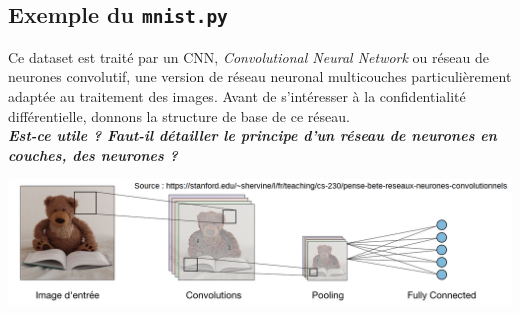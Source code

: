 \documentclass[a4paper,11pt]{article} %
\newcommand{\ttt}[1]{\texttt{#1}}
\begin{document}
\subsection{Exemple du \ttt{mnist.py}}
%
Ce dataset est traité par un CNN, \emph{Convolutional Neural Network} ou réseau de neurones convolutif, une version de réseau neuronal multicouches particulièrement adaptée au traitement des images. Avant de s'intéresser à la confidentialité différentielle, donnons la structure de base de ce réseau.\\
\textbf{\emph{Est-ce utile ? Faut-il détailler le principe d'un réseau de neurones en couches, des neurones ?}}
\begin{center}
	\includegraphics[width=\linewidth]{architecture-cnn.png}
\end{center}
\end{document}
